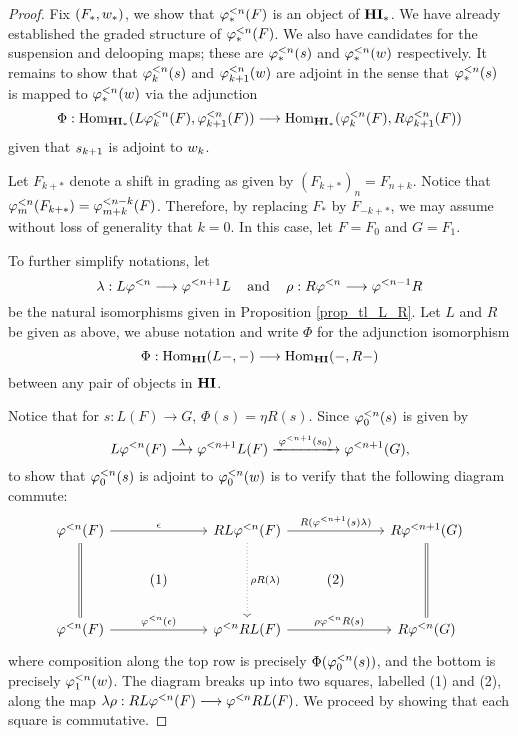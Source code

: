 \begin{proof}
Fix $(F_*, \deloop_*)$, we show that $\tlHM{n}(F)$ is an object of
$\HM$. We have already established the graded structure of 
$\tlHM{n}(F)$. We also have candidates for the suspension and 
delooping maps; these are $\suspTL{n}$ and $\deloopTL{n}$ 
respectively. It remains to show that $\suspTL[k]{n}$ and 
$\deloopTL[k + 1]{n}$ are adjoint in the sense that $\suspTL{n}$ is 
mapped to $\deloopTL{n}$ via the adjunction 
\[
\Phi: \homHM(L \tlHM[k]{n}(F), \tlHM[k + 1]{n}(F))
\to \homHM(\tlHM[k]{n}(F), R \tlHM[k + 1]{n}(F))
\]
given that $\susp_{k + 1}$ is adjoint to $\deloop_k$.

Let $F_{k + *}$ denote a shift in grading as given 
by $(F_{k + *})_n = F_{n + k}$. Notice that $\tlHM[m]{n}(F_{k + *}) = 
\tlHM[m + k]{n - k}(F)$. Therefore, by replacing $F_*$ by 
$F_{-k + *}$, we may assume without loss of generality that 
$k = 0$. In this case, let $F = F_0$ and $G = F_1$.

To further simplify notations, let
\[
\lambda : L\tlHI{n} \to \tlHI{n + 1}L\;\;\;\textrm{ and }\;\;\;
   \rho : R\tlHI{n} \to \tlHI{n - 1}R
\]
be the natural isomorphisms given in Proposition \ref{prop_tl_L_R}. 
Let $L$ and $R$ be given as above,  we abuse notation and write $\Phi$ for the 
adjunction isomorphism
\[
\Phi: \homHI(L-, -) \to \homHI(-,R-)
\]
between any pair of objects in $\HI$.

Notice that for $s: L(F) \to G$, $\Phi(s) = \eta R(s)$.
Since $\suspTL[0]{n}$ is given by
\[
L\tlHI{n}(F) \stackrel{\lambda}{\to} \tlHI{n + 1} L(F)
   \xrightarrow{\;\tlHI{n + 1}(\susp_0)\;} \tlHI{n + 1}(G),
\]
to show that $\suspTL[0]{n}$ is adjoint to $\deloopTL[0]{n}$ is to
verify that the following diagram commute:
\[
\begin{tikzcd}
\tlHI{n}(F) \arrow{rr}{\epsilon} \arrow[equals]{dd} &&
RL\tlHI{n}(F) \arrow{rr}{R(\tlHI{n + 1}(\susp) \lambda)} 
\arrow[dotted]{dd}{\rho R(\lambda)}&&
R \tlHI{n + 1} (G) \arrow[equals]{dd} \\
& (1) && (2) \\
\tlHI{n}(F) \arrow{rr}{\tlHI{n}(\epsilon)} &&
\tlHI{n} RL(F) \arrow{rr}{\rho \tlHI{n} R(\susp)} &&
R\tlHI{n}(G)
\end{tikzcd}
\]
where composition along the top row is precisely 
$\Phi(\suspTL[0]{n})$, and the bottom is precisely 
$\deloopTL[1]{n}$. The diagram breaks up into two squares,
labelled (1) and (2), along the map $\lambda \rho: RL 
\tlHI{n}(F) \to \tlHI{n} RL(F)$. We proceed by showing that 
each square is commutative.


\end{proof}
